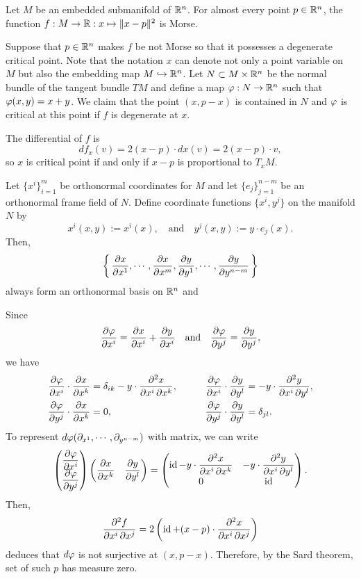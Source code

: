 \documentclass{../note}
\begin{document}
\begin{prop}
Let $M$ be an embedded submanifold of $\mathbb{R}^n$.
For almost every point $p\in\mathbb{R}^n$, the function $f:M\to\mathbb{R}:x\mapsto\|x-p\|^2$ is Morse.
\end{prop}
\begin{pf}
Suppose that $p\in\mathbb{R}^n$ makes $f$ be not Morse so that it possesses a degenerate critical point.
Note that the notation $x$ can denote not only a point variable on $M$ but also the embedding map $M\hookrightarrow\mathbb{R}^n$.
Let $N\subset M\times\mathbb{R}^n$ be the normal bundle of the tangent bundle $TM$ and define a map $\varphi:N\to\mathbb{R}^n$ such that $\varphi(x,y)=x+y$.
We claim that the point $(x,p-x)$ is contained in $N$ and $\varphi$ is critical at this point if $f$ is degenerate at $x$.

The differential of $f$ is
\[df_x(v)=2(x-p)\cdot dx(v)=2(x-p)\cdot v,\]
so $x$ is critical point if and only if $x-p$ is proportional to $T_xM$.

Let $\{x^i\}_{i=1}^m$ be orthonormal coordinates for $M$ and let $\{e_j\}_{j=1}^{n-m}$ be an orthonormal frame field of $N$.
Define coordinate functions $\{x^i,y^j\}$ on the manifold $N$ by
\[x^i(x,y):=x^i(x),\quad\text{and}\quad y^j(x,y):=y\cdot e_j(x).\]
Then,
\[\left\{\,\pd{x}{x^1},\cdots,\pd{x}{x^m},\pd{y}{y^1},\cdots,\pd{y}{y^{n-m}}\,\right\}\]
always form an orthonormal basis on $\mathbb{R}^n$ and

Since
\[\pd{\f}{x^i}=\pd{x}{x^i}+\pd{y}{x^i}\quad\text{and}\quad\pd{\f}{y^j}=\pd{y}{y^j},\]
we have
\begin{alignat*}{2}
\pd{\f}{x^i}\cdot\pd{x}{x^k}&=\delta_{ik}-y\cdot\pd{x}{x^i}{x^k},\qquad&
\pd{\f}{x^i}\cdot\pd{y}{y^l}&=-y\cdot\pd{y}{x^i}{y^l},\\
\pd{\f}{y^j}\cdot\pd{x}{x^k}&=0,&
\pd{\f}{y^j}\cdot\pd{y}{y^l}&=\delta_{jl}.
\end{alignat*}
To represent $d\f(\pd_{x^1},\cdots,\pd_{y^{n-m}})$ with matrix, we can write
\[\begin{pmatrix}\displaystyle\pd{\f}{x^i}\\\displaystyle\pd{\f}{y^j}\end{pmatrix}
\begin{pmatrix}\displaystyle\pd{x}{x^k}&\displaystyle\pd{y}{y^l}\end{pmatrix}
=\begin{pmatrix}\displaystyle\id-y\cdot\pd{x}{x^i}{x^k}&\displaystyle-y\cdot\pd{y}{x^i}{y^l}\\0&\id\end{pmatrix}.\]
Then,
\[\pd{f}{x^i}{x^j}=2\left(\id+(x-p)\cdot\pd{x}{x^i}{x^j}\right)\]
deduces that $d\varphi$ is not surjective at $(x,p-x)$.
Therefore, by the Sard theorem, set of such $p$ has measure zero.
\end{pf}
\end{document}
